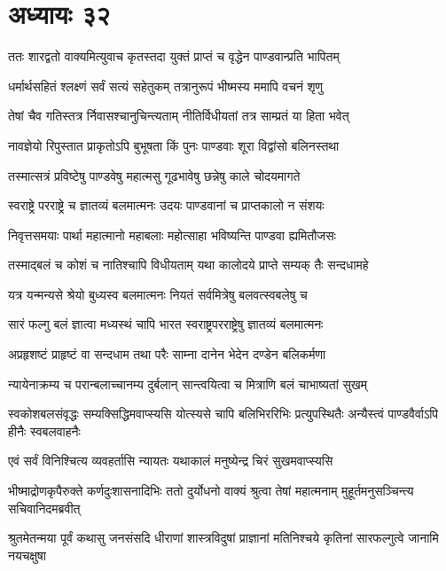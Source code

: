 \chapter{अध्यायः ३२}

\twolineshloka
{ततः शारद्वतो वाक्यमित्युवाच कृतस्तदा}
{युक्तं प्राप्तं च वृद्धेन पाण्डवान्प्रति भापितम्}


\twolineshloka
{धर्मार्थसहितं श्लक्ष्णं सर्वं सत्यं सहेतुकम्}
{तत्रानुरूपं भीष्मस्य ममापि वचनं शृणु}


\twolineshloka
{तेषां चैव गतिस्तत्र र्निवासश्चानुचिन्त्यताम्}
{नीतिर्विधीयतां तत्र साम्प्रतं या हिता भवेत्}


\twolineshloka
{नावज्ञेयो रिपुस्तात प्राकृतोऽपि बुभूषता}
{किं पुनः पाण्डवाः शूरा विद्वांसो बलिनस्तथा}


\twolineshloka
{तस्मात्सत्रं प्रविष्टेषु पाण्डवेषु महात्मसु}
{गूढभावेषु छन्नेषु काले चोदयमागते}


\twolineshloka
{स्वराष्ट्रे परराष्ट्रे च ज्ञातव्यं बलमात्मनः}
{उदयः पाण्डवानां च प्राप्तकालो न संशयः}


\twolineshloka
{निवृत्तसमयाः पार्था महात्मानो महाबलाः}
{महोत्साहा भविष्यन्ति पाण्डवा ह्यमितौजसः}


\twolineshloka
{तस्माद्बलं च कोशं च नातिश्चापि विधीयताम्}
{यथा कालोदये प्राप्ते सम्यक् तैः सन्दधामहे}


\twolineshloka
{यत्र यन्मन्यसे श्रेयो बुध्यस्व बलमात्मनः}
{नियतं सर्वमित्रेषु बलवत्स्वबलेषु च}


\twolineshloka
{सारं फल्गु बलं ज्ञात्वा मध्यस्थं चापि भारत}
{स्वराष्ट्रपरराष्ट्रेषु ज्ञातव्यं बलमात्मनः}


\twolineshloka
{अप्रहृशष्टं प्राहृष्टं वा सन्दधाम तथा परैः}
{साम्ना दानेन भेदेन दण्डेन बलिकर्मणा}


\twolineshloka
{न्यायेनाक्रम्य च परान्बलाच्चानम्य दुर्बलान्}
{सान्त्वयित्वा च मित्राणि बलं चाभाष्यतां सुखम्}


\threelineshloka
{स्वकोशबलसंवृद्धः सम्यक्सिद्धिमवाप्स्यसि}
{योत्स्यसे चापि बलिभिररिभिः प्रत्युपस्थितैः}
{अन्यैस्त्वं पाण्डवैर्वाऽपि हीनैः स्वबलवाहनैः}


\twolineshloka
{एवं सर्वं विनिश्चित्य व्यवहर्तासि न्यायतः}
{यथाकालं मनुष्येन्द्र चिरं सुखमवाप्स्यसि}


\threelineshloka
{भीष्माद्रोणकृपैरुक्ते कर्णदुःशासनादिभिः}
{ततो दुर्योधनो वाक्यं श्रुत्वा तेषां महात्मनाम्}
{मुहूर्तमनुसञ्चिन्त्य सचिवानिदमब्रवीत्}


\threelineshloka
{श्रुतमेतन्मया पूर्वं कथासु जनसंसदि}
{धीराणां शास्त्रविदुषां प्राज्ञानां मतिनिश्चये}
{कृतिनां सारफल्गुत्वे जानामि नयचक्षुषा}



